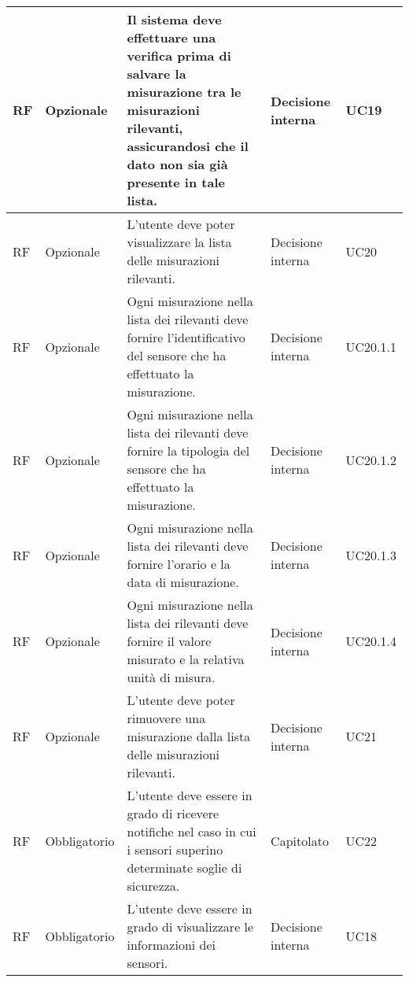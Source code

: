 \begin{longtable}{|C{1.5cm}|C{2cm}|L{5cm}|C{2cm}|C{1.5cm}|}
    \hline
     RF & Opzionale & Il sistema deve effettuare una verifica prima di salvare la misurazione tra le misurazioni rilevanti, assicurandosi che il dato non sia già presente in tale lista. & Decisione interna & UC19  \\
    
    \hline
     RF & Opzionale & L'utente deve poter visualizzare la lista delle misurazioni rilevanti. & Decisione interna & UC20 \\
    
    \hline
     RF & Opzionale & Ogni misurazione nella lista dei rilevanti deve fornire l'identificativo del sensore che ha effettuato la misurazione. & Decisione interna & UC20.1.1 \\

    \hline
     RF & Opzionale & Ogni misurazione nella lista dei rilevanti deve fornire la tipologia del sensore che ha effettuato la misurazione. & Decisione interna & UC20.1.2 \\

    \hline
     RF & Opzionale & Ogni misurazione nella lista dei rilevanti deve fornire l'orario e la data di misurazione. & Decisione interna & UC20.1.3 \\

    \hline
     RF & Opzionale & Ogni misurazione nella lista dei rilevanti deve fornire il valore misurato e la relativa unità di misura. & Decisione interna & UC20.1.4 \\

    \hline
     RF & Opzionale & L'utente deve poter rimuovere una misurazione dalla lista delle misurazioni rilevanti. & Decisione interna & UC21 \\

    \hline
     RF & Obbligatorio & L'utente deve essere in grado di ricevere notifiche nel caso in cui i sensori superino determinate soglie di sicurezza. & Capitolato & UC22 \\

    \hline
     RF & Obbligatorio & L'utente deve essere in grado di visualizzare le informazioni dei sensori. & Decisione interna & UC18 \\


\end{longtable}

